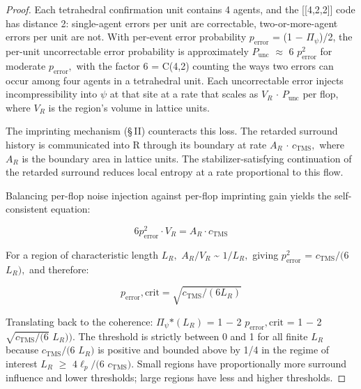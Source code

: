 \documentclass[11pt,oneside]{report}
\theoremstyle{definition}
\theoremstyle{remark}
\begin{document}
\begin{proof}
Each tetrahedral confirmation unit contains 4 agents, and the
[[4,2,2]] code has distance 2: single-agent errors per unit are
correctable, two-or-more-agent errors per unit are not. With per-event
error probability \ensuremath{p_{\mathrm{error}}} = (1 \ensuremath{-} \textbar \ensuremath{\Pi_{\psi}}\textbar)/2, the per-unit
uncorrectable error probability is approximately \ensuremath{P_{\mathrm{unc}}} \ensuremath{\approx} 6 \ensuremath{p^{2}_{\mathrm{error}}}
for moderate \ensuremath{p_{\mathrm{error}},} with the factor 6 = C(4,2) counting the ways two
errors can occur among four agents in a tetrahedral unit. Each
uncorrectable error injects incompressibility into \ensuremath{\psi} at that site at a
rate that scales as \ensuremath{V_{R}} \ensuremath{\cdot} \ensuremath{P_{\mathrm{unc}}} per flop, where \ensuremath{V_{R}} is the region's
volume in lattice units.

The imprinting mechanism (\S\,II) counteracts this loss. The retarded
surround history is communicated into R through its boundary at rate
\ensuremath{A_{R}} \ensuremath{\cdot} \ensuremath{c_{\mathrm{TMS}},} where \ensuremath{A_{R}} is the boundary area in lattice units. The
stabilizer-satisfying continuation of the retarded surround reduces
local entropy at a rate proportional to this flow.

Balancing per-flop noise injection against per-flop imprinting gain
yields the self-consistent equation:

\begin{equation*}
6 p^{2}_{\mathrm{error}} \cdot V_{R} = A_{R} \cdot c_{\mathrm{TMS}}
\end{equation*}

For a region of characteristic length \ensuremath{L_{R},} \ensuremath{A_{R}/V_{R}} \textasciitilde{}
\ensuremath{1/L_{R},} giving \ensuremath{p^{2}_{\mathrm{error}}} = \ensuremath{c_{\mathrm{TMS}}/(6} \ensuremath{L_{R}),} and therefore:

\begin{equation*}
p_{\mathrm{error}},\text{crit} = \sqrt{c_{\mathrm{TMS}} / (6 L_{R})}
\end{equation*}

Translating back to the coherence: \textbar \ensuremath{\Pi_{\psi}}\textbar\ensuremath{*(L_{R})} = 1 \ensuremath{-} 2
\ensuremath{p_{\mathrm{error}},\text{crit}} = 1 \ensuremath{-} 2 \ensuremath{\sqrt{c_{\mathrm{TMS}}/(6}} \ensuremath{L_{R})).} The threshold is strictly
between 0 and 1 for all finite \ensuremath{L_{R}} because \ensuremath{c_{\mathrm{TMS}}/(6} \ensuremath{L_{R})} is positive
and bounded above by 1/4 in the regime of interest \ensuremath{L_{R}} \ensuremath{\geq} \ensuremath{4\ell_{p}/(6} \ensuremath{c_{\mathrm{TMS}}).}
Small regions have proportionally more surround influence and lower
thresholds; large regions have less and higher thresholds.

\end{proof}
\end{document}

